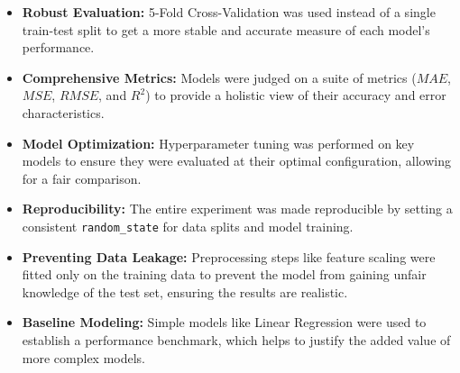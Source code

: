\documentclass[12pt]{article}
\begin{document}
\begin{itemize}
    \item \textbf{Robust Evaluation:} 5-Fold Cross-Validation was used instead of a single train-test split to get a more stable and accurate measure of each model's performance.

    \item \textbf{Comprehensive Metrics:} Models were judged on a suite of metrics ($MAE$, $MSE$, $RMSE$, and $R^2$) to provide a holistic view of their accuracy and error characteristics.

    \item \textbf{Model Optimization:} Hyperparameter tuning was performed on key models to ensure they were evaluated at their optimal configuration, allowing for a fair comparison.

    \item \textbf{Reproducibility:} The entire experiment was made reproducible by setting a consistent \texttt{random\_state} for data splits and model training.

    \item \textbf{Preventing Data Leakage:} Preprocessing steps like feature scaling were fitted only on the training data to prevent the model from gaining unfair knowledge of the test set, ensuring the results are realistic.
    
    \item \textbf{Baseline Modeling:} Simple models like Linear Regression were used to establish a performance benchmark, which helps to justify the added value of more complex models.
\end{itemize}
\end{document}

